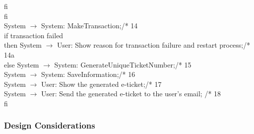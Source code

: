 \phantom{x}\hspace{7mm} fi\\
fi\\
System $\rightarrow$ System: MakeTransaction;\hfill /* 14\\
if transaction failed\\
then System $\rightarrow$ User: Show reason for transaction failure and restart process;\hfill /* 14a\\
else System $\rightarrow$ System: GenerateUniqueTicketNumber;\hfill /* 15\\
\phantom{x}\hspace{4mm} System $\rightarrow$ System: SaveInformation;\hfill /* 16\\
\phantom{x}\hspace{4mm} System $\rightarrow$ User: Show the generated e-ticket;\hfill /* 17\\
\phantom{x}\hspace{4mm} System $\rightarrow$ User: Send the generated e-ticket to the user's email; \hfill /* 18\\
fi

\iffalse
\subsubsection{Grey box SD}
\creator{Name \textsc{Surname}}
\updater{Name \textsc{Surname}}

\subsubsection{Whte box SD}
\creator{Name \textsc{Surname}}
\updater{Name \textsc{Surname}}


\fi

\subsubsection{Design Considerations}
